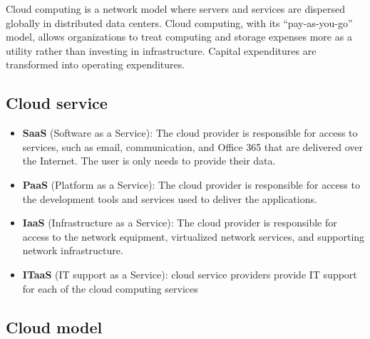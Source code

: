 Cloud computing is a network model where servers and services are dispersed globally in distributed data centers. Cloud computing, with its “pay-as-you-go” model, allows organizations to treat computing and storage expenses more as a utility rather than investing in infrastructure. Capital expenditures are transformed into operating expenditures.\\

\subsection{Cloud service}

\begin{itemize}
\item \textbf{SaaS} (Software as a Service): The cloud provider is responsible for access to services, such as email, communication, and Office 365 that are delivered over the Internet. The user is only needs to provide their data.
\item \textbf{PaaS} (Platform as a Service): The cloud provider is responsible for access to the development tools and services used to deliver the applications.
\item \textbf{IaaS} (Infrastructure as a Service): The cloud provider is responsible for access to the network equipment, virtualized network services, and supporting network infrastructure.
\item \textbf{ITaaS} (IT support as a Service): cloud service providers provide IT support for each of the cloud computing services
\end{itemize} 

\subsection{Cloud model}

